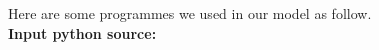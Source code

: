 \documentclass{mcmthesis}
\begin{document}
\begin{appendices}






Here are some programmes we used in our model as follow.\\

\textbf{\textcolor[rgb]{0.98,0.00,0.00}{Input python source:}}



\end{appendices}




\end{document}
